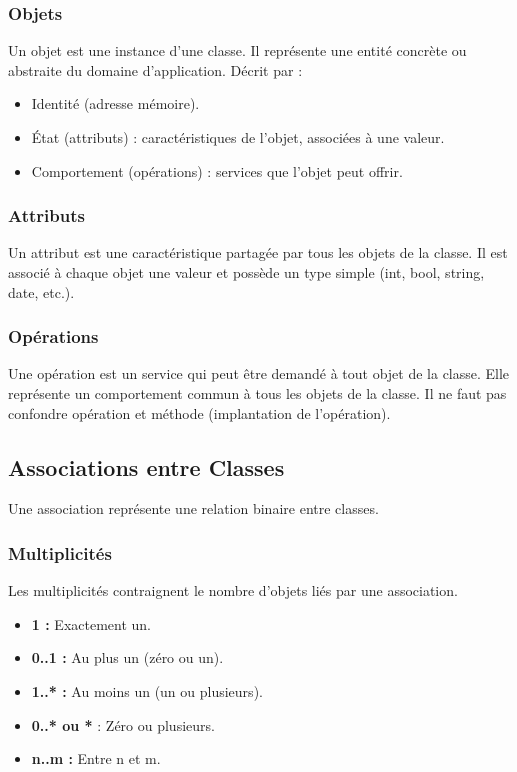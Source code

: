 \documentclass{article}
\begin{document}
\begin{itemize}
\subsubsection{Objets}

Un objet est une instance d'une classe.  Il représente une entité concrète ou abstraite du domaine d'application. Décrit par :

\begin{itemize}
    \item Identité (adresse mémoire).
    \item État (attributs) : caractéristiques de l'objet, associées à une valeur.
    \item Comportement (opérations) : services que l'objet peut offrir.
\end{itemize}

\subsubsection{Attributs}

Un attribut est une caractéristique partagée par tous les objets de la classe.  Il est associé à chaque objet une valeur et possède un type simple (int, bool, string, date, etc.).

\subsubsection{Opérations}

Une opération est un service qui peut être demandé à tout objet de la classe.  Elle représente un comportement commun à tous les objets de la classe.  Il ne faut pas confondre opération et méthode (implantation de l'opération).

\subsection{Associations entre Classes}

Une association représente une relation binaire entre classes.

\subsubsection{Multiplicités}

Les multiplicités contraignent le nombre d'objets liés par une association.

\begin{itemize}
    \item \textbf{1 :} Exactement un.
    \item \textbf{0..1 :} Au plus un (zéro ou un).
    \item \textbf{1..* :} Au moins un (un ou plusieurs).
    \item \textbf{0..* ou *} : Zéro ou plusieurs.
    \item \textbf{n..m :} Entre n et m.
    \end{itemize}


\end{itemize}
\end{document}
